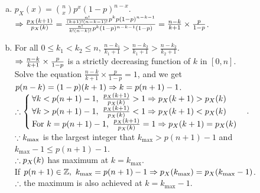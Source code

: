\begin{pr}$ $
\begin{enumerate}[(a)]
\item $p_X(x)=\binom nxp^x(1-p)^{n-x}$.\\
$\Rightarrow\frac{p_X(k+1)}{p_X(k)}=\frac{\frac{n!}{(k+1)!(n-k-1)!}p^kp(1-p)^{n-k-1}}{\frac{n!}{k!(n-k)!}p^k(1-p)^{n-k-1}(1-p)}=\frac{n-k}{k+1}\times\frac p{1-p}$.
\item For all $0\leq k_1<k_2\leq n$, $\frac{n-k_1}{k_1+1}>\frac{n-k_2}{k_1+1}>\frac{n-k_2}{k_2+1}$.\\
$\Rightarrow\frac{n-k}{k+1}\times\frac p{1-p}$ is a strictly decreasing function of $k$ in $[0, n]$.\\
Solve the equation $\frac{n-k}{k+1}\times\frac p{1-p}=1$, and we get $p(n-k)=(1-p)(k+1)\Rightarrow k=p(n+1)-1$.\\
$\therefore\begin{cases}
\forall k<p(n+1)-1,\ \frac{p_X(k+1)}{p_X(k)}>1\Rightarrow p_X(k+1)>p_X(k)\\
\forall k>p(n+1)-1,\ \frac{p_X(k+1)}{p_X(k)}<1\Rightarrow p_X(k+1)<p_X(k)\\
\text{For }k=p(n+1)-1,\ \frac{p_X(k+1)}{p_X(k)}=1\Rightarrow p_X(k+1)=p_X(k)
\end{cases}$.\\
$\because k_{\max}$ is the largest integer that $k_{\max}>p(n+1)-1$ and $k_{\max}-1\leq p(n+1)-1$.\\
$\therefore p_X(k)$ has maximum at $k=k_{\max}$.\\
If $p(n+1)\in\mathbb{Z},\ k_{\max}=p(n+1)-1\Rightarrow p_X(k_{\max})=p_X(k_{\max}-1)$.\\
$\therefore$ the maximum is also achieved at $k=k_{\max}-1$.
\end{enumerate}
\end{pr}
